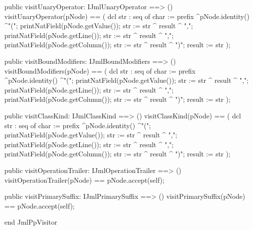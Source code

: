 \begin{vdm_al}
  public visitUnaryOperator: IJmlUnaryOperator ==> ()
  visitUnaryOperator(pNode) == 
    ( dcl str : seq of char := prefix ^pNode.identity() ^"(";
      printNatField(pNode.getValue());
      str := str ^ result ^ ",";
      printNatField(pNode.getLine());
      str := str ^ result ^ ",";
      printNatField(pNode.getColumn());
      str := str ^ result ^ ")";
      result := str );

  public visitBoundModifiers: IJmlBoundModifiers ==> ()
  visitBoundModifiers(pNode) == 
    ( dcl str : seq of char := prefix ^pNode.identity() ^"(";
      printNatField(pNode.getValue());
      str := str ^ result ^ ",";
      printNatField(pNode.getLine());
      str := str ^ result ^ ",";
      printNatField(pNode.getColumn());
      str := str ^ result ^ ")";
      result := str );

  public visitClassKind: IJmlClassKind ==> ()
  visitClassKind(pNode) == 
    ( dcl str : seq of char := prefix ^pNode.identity() ^"(";
      printNatField(pNode.getValue());
      str := str ^ result ^ ",";
      printNatField(pNode.getLine());
      str := str ^ result ^ ",";
      printNatField(pNode.getColumn());
      str := str ^ result ^ ")";
      result := str );

  public visitOperationTrailer: IJmlOperationTrailer ==> ()
  visitOperationTrailer(pNode) == pNode.accept(self);

  public visitPrimarySuffix: IJmlPrimarySuffix ==> ()
  visitPrimarySuffix(pNode) == pNode.accept(self);

end JmlPpVisitor
\end{vdm_al}
